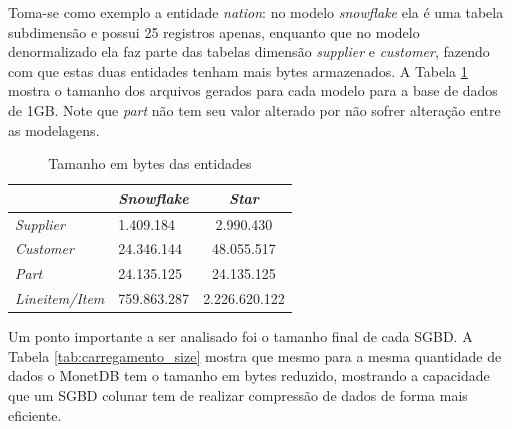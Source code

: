 Toma-se como exemplo a entidade \textit{nation}: no modelo \textit{snowflake} ela é uma tabela subdimensão e possui 25 registros apenas, enquanto que no modelo denormalizado ela faz parte das tabelas dimensão \textit{supplier} e \textit{customer}, fazendo com que estas duas entidades tenham mais bytes armazenados. A Tabela \ref{tab:tamanho} mostra o tamanho dos arquivos gerados para cada modelo para a base de dados de 1GB. Note que \textit{part} não tem seu valor alterado por não sofrer alteração entre as modelagens.

\begin{table}[htpb]
        \centering
        \caption{Tamanho em bytes das entidades}
        \label{tab:tamanho}
        \begin{tabular}{l|l|c|}
        \cline{2-3}
                                                     & \textit{Snowflake} & \textit{Star} \\ \hline
        \multicolumn{1}{|l|}{\textit{Supplier}}      & 1.409.184          & 2.990.430     \\ \hline
        \multicolumn{1}{|l|}{\textit{Customer}}      & 24.346.144         & 48.055.517    \\ \hline
        \multicolumn{1}{|l|}{\textit{Part}}          & 24.135.125         & 24.135.125    \\ \hline
        \multicolumn{1}{|l|}{\textit{Lineitem/Item}} & 759.863.287        & 2.226.620.122 \\ \hline
        \end{tabular}
        \end{table}


Um ponto importante a ser analisado foi o tamanho final de cada SGBD. A Tabela \ref{tab:carregamento_size} 
mostra que mesmo para a mesma quantidade de dados o MonetDB tem o tamanho em bytes reduzido, mostrando a capacidade 
que um SGBD colunar tem de realizar compressão de dados de forma mais eficiente.

